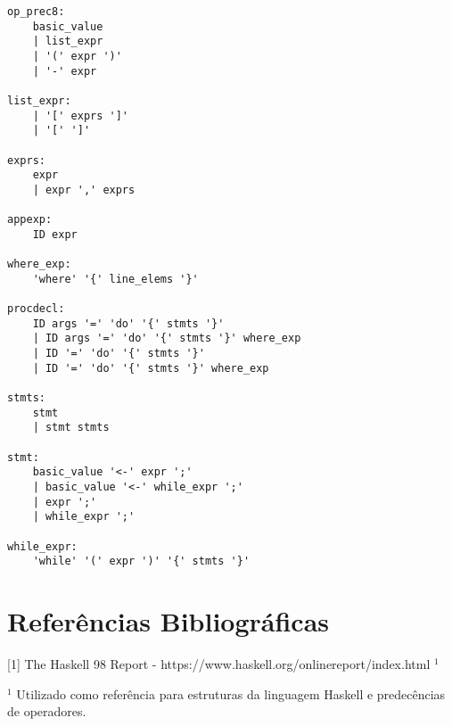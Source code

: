 \documentclass[11pt]{article}
\begin{document}
\begin{lstlisting}[basicstyle=\small]
op_prec8:
    basic_value
    | list_expr
    | '(' expr ')'
    | '-' expr

list_expr:
    | '[' exprs ']'
    | '[' ']'
    
exprs:
    expr
    | expr ',' exprs

appexp:
    ID expr

where_exp:
    'where' '{' line_elems '}' 

procdecl:
    ID args '=' 'do' '{' stmts '}'
    | ID args '=' 'do' '{' stmts '}' where_exp
    | ID '=' 'do' '{' stmts '}'
    | ID '=' 'do' '{' stmts '}' where_exp

stmts:
    stmt
    | stmt stmts

stmt:
    basic_value '<-' expr ';'
    | basic_value '<-' while_expr ';'
    | expr ';'
    | while_expr ';'

while_expr:
    'while' '(' expr ')' '{' stmts '}' 
\end{lstlisting}

\section{Referências Bibliográficas}
[1] The Haskell 98 Report - https://www.haskell.org/onlinereport/index.html $^1$

$^1$ Utilizado como referência para estruturas da linguagem Haskell e predecências de operadores.
\end{document}
